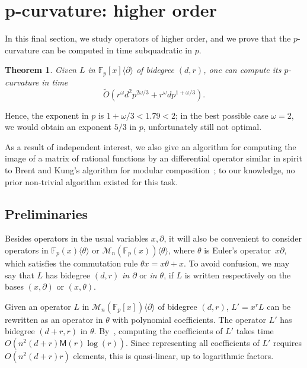 \documentclass{sig-alternate}
\newcommand{\bigOsoft}{\tilde{O}}
\def\F {\mathbb{F}}
\def\M{\ensuremath{\mathsf{M}}}
\newtheorem{theorem}{Theorem}
\begin{document}
\section{p-curvature: higher order}\label{sec:high}

\noindent In this final section, we study operators of higher order,
and we prove that the $p$-curvature can be computed in time
subquadratic in $p$. 
\begin{theorem}
  Given $L$ in $\F_p[x]\langle \partial \rangle$ of bidegree $(d,r)$,
  one can compute its $p$-curvature in time
$$\bigOsoft(r^\omega d^2 p^{2\omega/3} + r^\omega d p^{1+\omega/3}).$$
\end{theorem}
Hence, the exponent in $p$ is ${1+\omega/3} < 1.79 < 2$; in the best
possible case $\omega=2$, we would obtain an exponent ${5/3}$ in $p$,
unfortunately still not optimal.

As a result of independent interest, we also give an algorithm for
computing the image of a matrix of rational functions by an
differential operator similar in spirit to Brent and Kung's algorithm
for modular composition~\cite{BrKu78}; to our knowledge, no prior
non-trivial algorithm existed for this task.



\subsection{Preliminaries}

\smallskip{}
Besides operators in the usual variables $x,\partial$, it will also be
convenient to consider operators in $\F_p(x)\langle \theta \rangle$ or
$\mathscr{M}_n(\F_p(x))\langle \theta \rangle$, where $\theta$ is
Euler's operator~$x \partial$, which satisfies the commutation rule
$\theta x = x\theta + x$. To avoid confusion, we may say that $L$ has
bidegree $(d,r)$ {\em in $\partial$} or {\em in $\theta$}, if $L$ is
written respectively on the bases $(x,\partial)$ or $(x,\theta)$.

\smallskip{}
Given an operator $L$ in $\mathscr{M}_n(\F_p[x])\langle \partial
\rangle$ of bidegree $(d,r)$, $L'=x^r L$ can be rewritten as an
operator in $\theta$ with polynomial coefficients. The operator $L'$
has bidegree $(d+r,r)$ in $\theta$. By~\cite[Section~3.3]{BoChLe08},
computing the coefficients of $L'$ takes time $O(n^2
(d+r)\M(r)\log(r))$. Since representing all coefficients of $L'$
requires $O(n^2 (d+r)r)$ elements, this is quasi-linear, up to
logarithmic factors.
\end{document}
